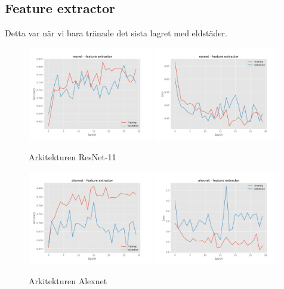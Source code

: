 \documentclass{kththesis}
\begin{document}
  \subsection{Feature extractor}
  Detta var när vi bara tränade det sista lagret med eldstäder.

  \begin{figure}
    \centering
    \includegraphics[width=0.49\textwidth]{"./fireplace/fireplace-classification - acc - resnet - feature extractor"}
    \includegraphics[width=0.49\textwidth]{"./fireplace/fireplace-classification - loss - resnet - feature extractor"}
    \caption{Arkitekturen ResNet-11}
  \end{figure}

  \begin{figure}
    \centering
    \includegraphics[width=0.49\textwidth]{"./fireplace/fireplace-classification - acc - alexnet - feature extractor"}
    \includegraphics[width=0.49\textwidth]{"./fireplace/fireplace-classification - loss - alexnet - feature extractor"}
    \caption{Arkitekturen Alexnet}
  \end{figure}
\end{document}
